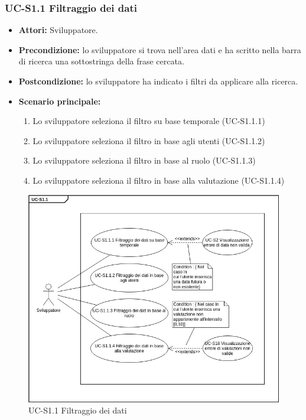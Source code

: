 	\subsubsection{UC-S1.1 Filtraggio dei dati}	
		\begin{itemize}
			\item \textbf{Attori:} Sviluppatore.
			\item \textbf{Precondizione:} lo sviluppatore si trova nell'area dati e ha scritto nella barra di ricerca una sottostringa della frase cercata.
			\item \textbf{Postcondizione:} lo sviluppatore ha indicato i filtri da applicare alla ricerca.
			\item \textbf{Scenario principale:}
				\begin{enumerate}
					\item Lo sviluppatore seleziona il filtro su base temporale (UC-S1.1.1)
					\item Lo sviluppatore seleziona il filtro in base agli utenti (UC-S1.1.2)
					\item Lo sviluppatore seleziona il filtro in base al ruolo (UC-S1.1.3)
					\item Lo sviluppatore seleziona il filtro in base alla valutazione (UC-S1.1.4)
				\end{enumerate}
			\end{itemize}
	\begin{figure}[h]
			\centering
			\includegraphics[scale=0.7]{images/UC-S1_1.png}
			\caption{UC-S1.1 Filtraggio dei dati}
		\end{figure}	
		
